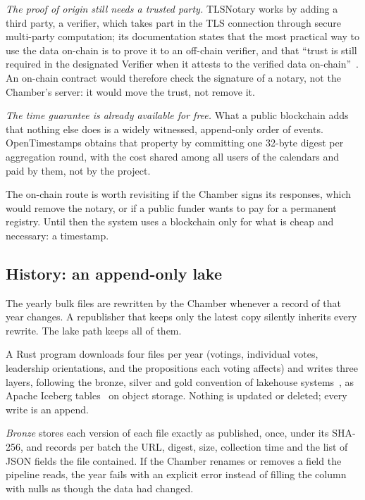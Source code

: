 \emph{The proof of origin still needs a trusted party.} TLSNotary works by adding a third party, a verifier, which takes part in the TLS connection through secure multi-party computation; its documentation states that the most practical way to use the data on-chain is to prove it to an off-chain verifier, and that ``trust is still required in the designated Verifier when it attests to the verified data on-chain''~\citep{tlsnotary-docs}. An on-chain contract would therefore check the signature of a notary, not the Chamber's server: it would move the trust, not remove it.

\emph{The time guarantee is already available for free.} What a public blockchain adds that nothing else does is a widely witnessed, append-only order of events. OpenTimestamps obtains that property by committing one 32-byte digest per aggregation round, with the cost shared among all users of the calendars and paid by them, not by the project.

The on-chain route is worth revisiting if the Chamber signs its responses, which would remove the notary, or if a public funder wants to pay for a permanent registry. Until then the system uses a blockchain only for what is cheap and necessary: a timestamp.

\subsection{History: an append-only lake}
\label{sec:lake}

The yearly bulk files are rewritten by the Chamber whenever a record of that year changes. A republisher that keeps only the latest copy silently inherits every rewrite. The lake path keeps all of them.

A Rust program downloads four files per year (votings, individual votes, leadership orientations, and the propositions each voting affects) and writes three layers, following the bronze, silver and gold convention of lakehouse systems~\citep{armbrust2021lakehouse}, as Apache Iceberg tables~\citep{iceberg-spec} on object storage. Nothing is updated or deleted; every write is an append.

\emph{Bronze} stores each version of each file exactly as published, once, under its SHA-256, and records per batch the URL, digest, size, collection time and the list of JSON fields the file contained. If the Chamber renames or removes a field the pipeline reads, the year fails with an explicit error instead of filling the column with nulls as though the data had changed.

